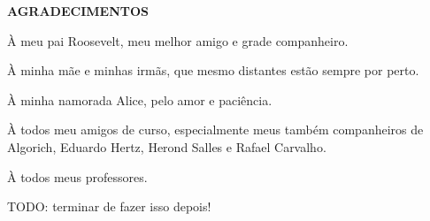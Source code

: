 \begin{center}
\textbf{AGRADECIMENTOS} \\ [2.5cm]
\end{center}

À meu pai Roosevelt, meu melhor amigo e grade companheiro.

À minha mãe e minhas irmãs, que mesmo distantes estão sempre por perto.

À minha namorada Alice, pelo amor e paciência.

À todos meu amigos de curso, especialmente meus também companheiros de Algorich, Eduardo Hertz, Herond Salles e Rafael Carvalho.

À todos meus professores.

TODO: terminar de fazer isso depois!